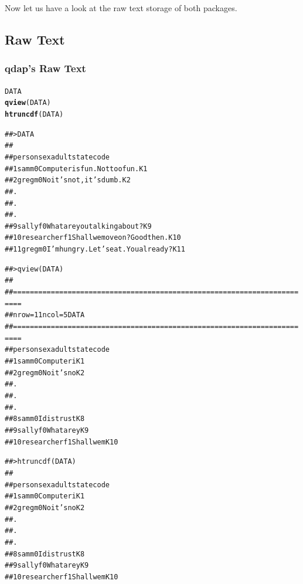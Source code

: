 \documentclass{article}\usepackage[]{graphicx}\usepackage[]{color}
\makeatletter
\newcommand{\hlstd}[1]{\textcolor[rgb]{0.345,0.345,0.345}{#1}}%
\newcommand{\hlkwd}[1]{\textcolor[rgb]{0.737,0.353,0.396}{\textbf{#1}}}%
\newenvironment{kframe}{%
 \def\at@end@of@kframe{}%
 \ifinner\ifhmode%
  \def\at@end@of@kframe{\end{minipage}}%
  \begin{minipage}{\columnwidth}%
 \fi\fi%
 \def\FrameCommand##1{\hskip\@totalleftmargin \hskip-\fboxsep
 \colorbox{shadecolor}{##1}\hskip-\fboxsep
     \hskip-\linewidth \hskip-\@totalleftmargin \hskip\columnwidth}%
 \MakeFramed {\advance\hsize-\width
   \@totalleftmargin\z@ \linewidth\hsize
   \@setminipage}}%
 {\par\unskip\endMakeFramed%
 \at@end@of@kframe}
\newenvironment{knitrout}{}{} %
\makeatother
\begin{document}
\noindent Now let us have a look at the raw text storage of both packages. \\ 

\subsection{Raw Text}
\subsubsection{qdap's Raw Text}
\begin{knitrout}
\color{fgcolor}\begin{kframe}
\begin{alltt}
\hlstd{DATA}
\hlkwd{qview}\hlstd{(DATA)}
\hlkwd{htruncdf}\hlstd{(DATA)}
\end{alltt}
\end{kframe}
\end{knitrout}


\begin{knitrout}
\color{fgcolor}\begin{kframe}
\begin{alltt}
## > DATA
##
##        person sex adult                                 state code
## 1         sam   m     0         Computer is fun. Not too fun.   K1
## 2        greg   m     0               No it's not, it's dumb.   K2
## .
## .
## .
## 9       sally   f     0           What are you talking about?   K9
## 10 researcher   f     1         Shall we move on?  Good then.  K10
## 11       greg   m     0 I'm hungry.  Let's eat.  You already?  K11


## > qview(DATA)
##
## ========================================================================
## nrow =  11           ncol =  5             DATA
## ========================================================================
##        person sex adult      state code
## 1         sam   m     0 Computer i   K1
## 2        greg   m     0 No it's no   K2
## .
## .
## .
## 8         sam   m     0 I distrust   K8
## 9       sally   f     0 What are y   K9
## 10 researcher   f     1 Shall we m  K10

## > htruncdf(DATA)
##
##        person sex adult      state code
## 1         sam   m     0 Computer i   K1
## 2        greg   m     0 No it's no   K2
## .
## .
## .
## 8         sam   m     0 I distrust   K8
## 9       sally   f     0 What are y   K9
## 10 researcher   f     1 Shall we m  K10
\end{alltt}
\end{kframe}
\end{knitrout}
\end{document}
